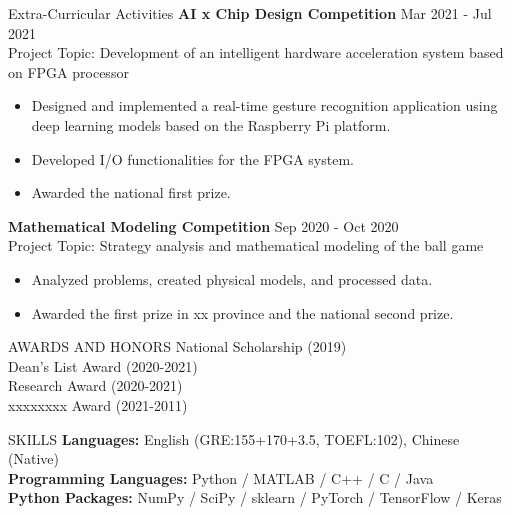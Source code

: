 \documentclass{resume} %
\begin{document}
\begin{rSection}{Extra-Curricular Activities} 
\textbf{AI x Chip Design Competition} \hfill Mar 2021 - Jul 2021\\
Project Topic: Development of an intelligent hardware acceleration system based on FPGA processor
\begin{itemize}
    \item Designed and implemented a real-time gesture recognition application using deep learning models based on the Raspberry Pi platform.
    \item Developed I/O functionalities for the FPGA system.
    \item Awarded the national first prize.
\end{itemize}

\textbf{Mathematical Modeling Competition} \hfill Sep 2020 - Oct 2020\\
Project Topic: Strategy analysis and mathematical modeling of the ball game
\begin{itemize}
    \item Analyzed problems, created physical models, and processed data.
    \item Awarded the first prize in xx province and the national second prize.
\end{itemize}
\end{rSection}

\begin{rSection}{AWARDS AND HONORS} 
National Scholarship (2019) \\
Dean’s List Award (2020-2021)\\
Research Award (2020-2021)\\
xxxxxxxx Award (2021-2011)
\end{rSection}

\begin{rSection}{SKILLS} 
\textbf{Languages:} English (GRE:155+170+3.5, TOEFL:102), Chinese (Native)\\
\textbf{Programming Languages:}	Python / MATLAB / C++ / C / Java \\
\textbf{Python Packages:} NumPy / SciPy / sklearn / PyTorch / TensorFlow / Keras \\
\end{rSection}
\end{document}
